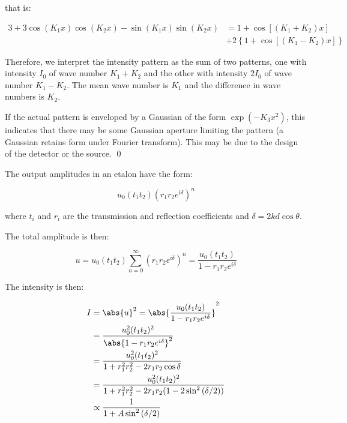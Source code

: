 \documentclass[12pt]{article}
\begin{document}
that is:

\begin{equation}
    \begin{split}
        3 + 3\cos{(K_{1} x)} \cos{(K_{2} x)} - \sin{(K_{1} x)} \sin{(K_{2} x)} &= 1 + \cos{[(K_{1} + K_{2})x]} \\
        &+ 2 \left\{ 1 + \cos{[(K_{1} - K_{2})x]} \right\}
    \end{split}
\end{equation}

Therefore, we interpret the intensity pattern as the sum of two patterns, one with intensity $I_{0}$ of wave number $K_{1} + K_{2}$ and the other with intensity $2I_{0}$ of wave number $K_{1} - K_{2}$. The mean wave number is $K_{1}$ and the difference in wave numbers is $K_{2}$.

If the actual pattern is enveloped by a Gaussian of the form $\exp (-K_{3} x^{2})$, this indicates that there may be some Gaussian aperture limiting the pattern (a Gaussian retains form under Fourier transform). This may be due to the design of the detector or the source.
\qed



The output amplitudes in an etalon have the form:

\begin{equation}
    u_{0} (t_{1} t_{2}) (r_{1} r_{2} e^{i \delta})^{n}
\end{equation}

where $t_{i}$ and $r_{i}$ are the transmission and reflection coefficients and $\delta = 2kd \cos{\theta}$.

The total amplitude is then:

\begin{equation}
    u = u_{0} (t_{1} t_{2}) \sum_{n = 0}^{\infty} (r_{1} r_{2} e^{i \delta})^{n} = \frac{u_{0} (t_{1} t_{2})}{1 - r_{1} r_{2} e^{i \delta}}
\end{equation}

The intensity is then:

\begin{equation}
    \begin{split}
        I &= \abs{u}^{2} = \abs{\frac{u_{0} (t_{1} t_{2})}{1 - r_{1} r_{2} e^{i \delta}}}^{2} \\
        &= \frac{u_{0}^{2} (t_{1} t_{2})^{2}}{\abs{1 - r_{1} r_{2} e^{i \delta}}^{2}} \\
        &= \frac{u_{0}^{2} (t_{1} t_{2})^{2}}{1 + r_{1}^{2} r_{2}^{2} - 2 r_{1} r_{2} \cos{\delta}} \\
        &= \frac{u_{0}^{2} (t_{1} t_{2})^{2}}{1 + r_{1}^{2} r_{2}^{2} - 2 r_{1} r_{2} (1 - 2 \sin^{2}{(\delta/2)})} \\
        &\propto \frac{1}{1 + A \sin^{2}{(\delta/2)}}
    \end{split}
\end{equation}
\end{document}
